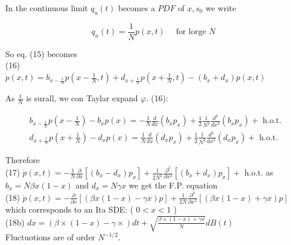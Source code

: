 \documentclass[10pt]{article}
\begin{document}
In the continuous limit $q_{u}(t)$ becomes a $P D F$ of $x, s_{0}$ we write

$$
q_{n}(t)=\frac{1}{N} p(x, t) \quad \text { for lorge } N
$$

So eq. (15) becomes\\
(16)\\
$\dot{p}(x, t)=b_{x-\frac{1}{N}} p\left(x-\frac{1}{N}, t\right)+d_{x+\frac{1}{N}} p\left(x+\frac{1}{N}, t\right)-\left(b_{x}+d_{x}\right) p(x, t)$

As $\frac{1}{N}$ is surall, we con Taylar expand $\varphi$. (16):

$$
\begin{aligned}
& b_{x-\frac{1}{N}} p\left(x-\frac{1}{N}\right)-b_{x} p(x)=-\frac{1}{N} \frac{d}{d x}\left(b_{x} p_{x}\right)+\frac{1}{2} \frac{1}{N^{2}} \frac{d^{2}}{d x^{2}}\left(b_{x} p_{x}\right)+\text { h.o.t. } \\
& d_{x+\frac{1}{N}} p\left(x+\frac{1}{N}\right)-d_{x} p(x)=\frac{1}{N} \frac{d}{d x}\left(d_{x} p_{x}\right)+\frac{1}{2} \frac{1}{N^{2}} \frac{d^{2}}{d x^{2}}\left(d_{x} p_{x}\right)+\text { h.o.t. }
\end{aligned}
$$

Therefore\\
(17) $\dot{p}(x, t)=-\frac{1}{N} \frac{\partial}{\partial x}\left[\left(b_{x}-d_{x}\right) p_{x}\right]+\frac{1}{2 N^{2}} \frac{\partial^{2}}{\partial x^{2}}\left[\left(b_{x}+d_{x}\right) p_{x}\right]+$ h.o.t. as $b_{x}=N \beta x(1-x)$ and $d_{x}=N \gamma x$ we get the F.P. equation\\
(18) $\dot{p}(x, t)=-\frac{\partial}{\partial x}[(\beta x(1-x)-\gamma x) p]+\frac{1}{2 N} \frac{\partial^{2}}{\partial x^{2}}[(\beta x(1-x)+\gamma x) p]$\\
which corresponds to an Ita SDE: ( $0<x<1$ )\\
(18b) $d x=(\beta \times(1-x)-\gamma \times) d t+\sqrt{\frac{\beta \times(1-x)+\gamma x}{N}} d B(t)$\\
Fluctuotions are of order $N^{-1 / 2}$.
\end{document}
